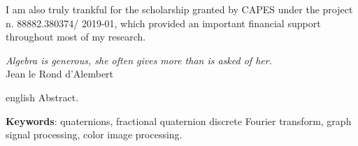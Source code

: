 \documentclass[
	11pt,				%
	openright,			%
	twoside,			%
	a4paper,			%
	french,				%
	brazil,			%
	english				%
	]{abntex2}
\begin{document}
\begin{agradecimentos}
I am also truly trankful for the scholarship granted by CAPES under the project n. 88882.380374/ 2019-01, which provided an important financial support throughout most of my research.
\end{agradecimentos}

\begin{epigrafe}
\vspace*{\fill}
\begin{flushright}
\textit{Algebra is generous, she often gives more than is asked of her.}\\
Jean le Rond d'Alembert
\end{flushright}
\end{epigrafe}

%
\begin{resumo}[Abstract]
\begin{otherlanguage*}{english}
Abstract.

\vspace{\onelineskip}

\noindent 
\textbf{Keywords}: quaternions, fractional quaternion discrete Fourier transform, graph signal processing, color image processing.
\end{otherlanguage*}
\end{resumo}
\end{document}
